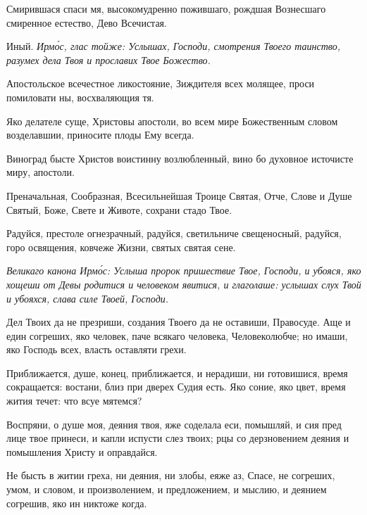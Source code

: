 
Смирившася спаси мя, высокомудренно пожившаго, рождшая Вознесшаго смиренное естество, Дево Всечистая.

Иный. \itshape Ирм\'{о}с\normalfont{}, глас тойже: Услышах, Господи, смотрения Твоего таинство, разумех дела Твоя и прославих Твое Божество.


Апостольское всечестное ликостояние, Зиждителя всех молящее, проси помиловати ны, восхваляющия тя.


Яко делателе суще, Христовы апостоли, во всем мире Божественным словом возделавшии, приносите плоды Ему всегда.


Виноград бысте Христов воистинну возлюбленный, вино бо духовное источисте миру, апостоли.


Преначальная, Сообразная, Всесильнейшая Троице Святая, Отче, Слове и Душе Святый, Боже, Свете и Животе, сохрани стадо Твое.


Радуйся, престоле огнезрачный, радуйся, светильниче свещеносный, радуйся, горо освящения, ковчеже Жизни, святых святая сене.

\itshape Великаго канона Ирм\'{о}с\normalfont{}: Услыша пророк пришествие Твое, Господи, и убояся, яко хощеши от Девы родитися и человеком явитися, и глаголаше: услышах слух Твой и убояхся, слава силе Твоей, Господи.

Дел Твоих да не презриши, создания Твоего да не оставиши, Правосуде. Аще и един согреших, яко человек, паче всякаго человека, Человеколюбче; но имаши, яко Господь всех, власть оставляти грехи.

Приближается, душе, конец, приближается, и нерадиши, ни готовишися, время сокращается: востани, близ при дверех Судия есть. Яко соние, яко цвет, время жития течет: что всуе мятемся?

Воспряни, о душе моя, деяния твоя, яже соделала еси, помышляй, и сия пред лице твое принеси, и капли испусти слез твоих; рцы со дерзновением деяния и помышления Христу и оправдайся.

Не бысть в житии греха, ни деяния, ни злобы, еяже аз, Спасе, не согреших, умом, и словом, и произволением, и предложением, и мыслию, и деянием согрешив, яко ин никтоже когда.

